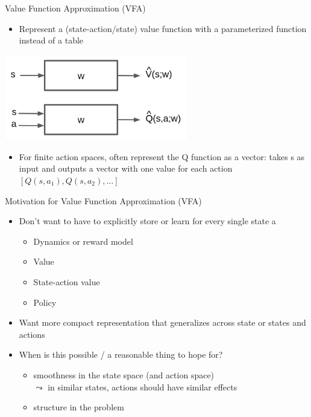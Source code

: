 \begin{frame}[c]{Value Function Approximation (VFA)}
	
	
	\begin{itemize}
		\item Represent a (state-action/state) value function with a parameterized
		function instead of a table
	\end{itemize}
	
	\begin{center}
		\includegraphics[width=0.6\textwidth]{images/vfa.png}
	\end{center}

	\begin{itemize}
		\item For finite action spaces, often represent the Q function as a vector:
		takes s as input and outputs a vector with one value for each action
		$[Q(s,a_1), Q(s,a_2), \ldots]$
	\end{itemize}
	
\end{frame}
\begin{frame}[c]{Motivation for Value Function Approximation (VFA)}
	
	\begin{itemize}
		\item Don’t want to have to explicitly store or learn for every single state a
		\begin{itemize}
			\item Dynamics or reward model
			\item Value
			\item State-action value
			\item Policy
		\end{itemize}
		\pause
		\item Want more compact representation that generalizes across state or
		states and actions
		\pause
		\item When is this possible / a reasonable thing to hope for?
		\begin{itemize}
			\item smoothness in the state space (and action space)\\
			$\leadsto$ in similar states, actions should have similar effects 
			\item structure in the problem
		\end{itemize}
	\end{itemize}
	
\end{frame}
